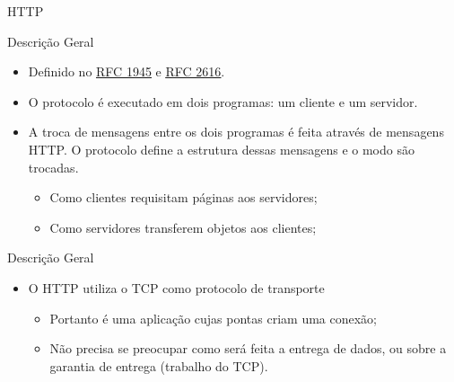 \documentclass{libs/ufc_format}
\begin{document}
\begin{frame}{}
    \centering
    \Large
    HTTP
\end{frame}

\begin{frame}{Descrição Geral}
    \begin{itemize}
        \justifying
        \item Definido no \underline{\href{https://datatracker.ietf.org/doc/html/rfc1945}{RFC 1945}} e \underline{\href{https://datatracker.ietf.org/doc/html/rfc2616.html}{RFC 2616}}.
        \item<2-> O protocolo é executado em dois programas: um cliente e um servidor. 
        \item<3-> A troca de mensagens entre os dois programas é feita através de mensagens HTTP. O protocolo define a estrutura dessas mensagens e o modo são trocadas.
            \begin{itemize}
                \justifying
                \item<4-> Como clientes requisitam páginas aos servidores;
                \item<4-> Como servidores transferem objetos aos clientes;
            \end{itemize} 
    \end{itemize}
\end{frame}

\begin{frame}{Descrição Geral}
    \begin{itemize}
        \justifying
        \item O HTTP utiliza o TCP como protocolo de transporte
            \begin{itemize}
                \justifying
                \item Portanto é uma aplicação cujas pontas criam uma conexão;
                \item Não precisa se preocupar como será feita a entrega de dados, ou sobre a garantia de entrega (trabalho do TCP).
            \end{itemize}
    \end{itemize}
\end{frame}
\end{document}

